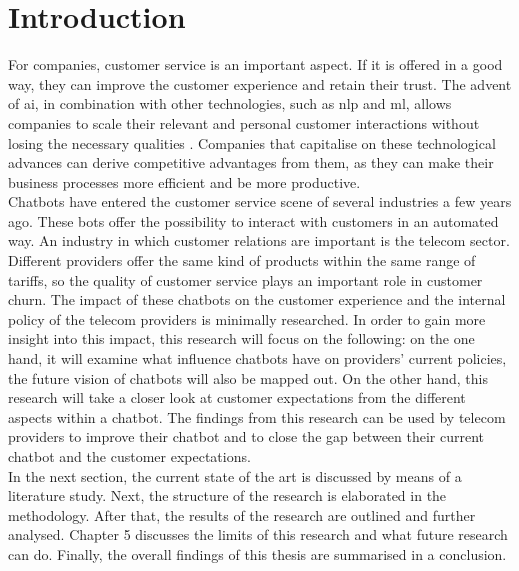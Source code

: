 \mainmatter
\pagestyle{headings}

\chapter{Introduction}
\label{ch:introduction}
For companies, customer service is an important aspect. If it is offered in a good way, they can improve the customer experience and retain their trust.
The advent of \acrshort{ai}, in combination with other technologies, such as \acrfull{nlp} and \acrfull{ml}, allows companies to scale their relevant and personal customer interactions without losing the necessary qualities \citep*{Quintino2019, Wilson2017}. Companies that capitalise on these technological advances can derive competitive advantages from them, as they can make their business processes more efficient and be more productive.\\
\break
Chatbots have entered the customer service scene of several industries a few years ago. These bots offer the possibility to interact with customers in an automated way. An industry in which customer relations are important is the telecom sector. Different providers offer the same kind of products within the same range of tariffs, so the quality of customer service plays an important role in customer churn. The impact of these chatbots on the customer experience and the internal policy of the telecom providers is minimally researched. In order to gain more insight into this impact, this research will focus on the following: on the one hand, it will examine what influence chatbots have on providers' current policies, the future vision of chatbots will also be mapped out. On the other hand, this research will take a closer look at customer expectations from the different aspects within a chatbot. The findings from this research can be used by telecom providers to improve their chatbot and to close the gap between their current chatbot and the customer expectations.\\
\break
In the next section, the current state of the art is discussed by means of a literature study. Next, the structure of the research is elaborated in the methodology. After that, the results of the research are outlined and further analysed. Chapter 5 discusses the limits of this research and what future research can do. Finally, the overall findings of this thesis are summarised in a conclusion.